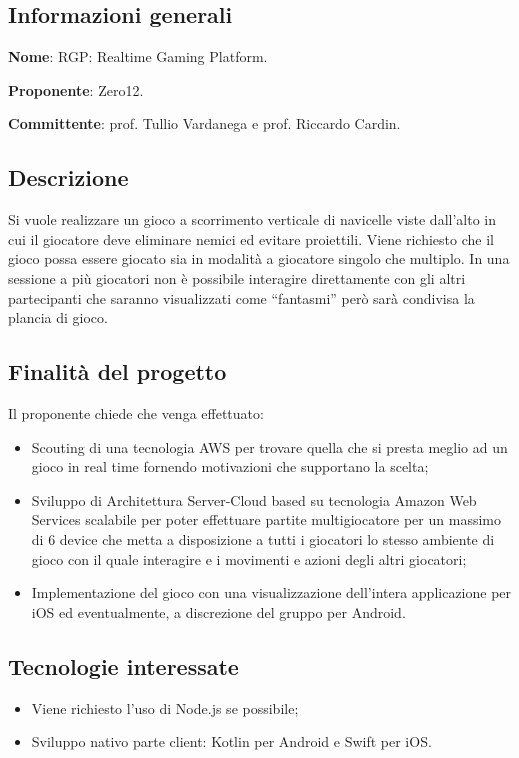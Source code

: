 \documentclass[../studio-di-fattibilita.tex]{subfiles}
\begin{document}
\subsection{Informazioni generali}%
\label{sub:c6_informazioni_generale}
\begin{description}
  \item \textbf{Nome}: RGP: Realtime Gaming Platform.
  \item \textbf{Proponente}: Zero12.
  \item \textbf{Committente}: prof. Tullio Vardanega e prof. Riccardo Cardin.
\end{description}

\subsection{Descrizione}%
\label{sub:c6_descrizione}
Si vuole realizzare un gioco a scorrimento verticale di navicelle viste dall’alto in cui il giocatore deve eliminare nemici ed evitare proiettili. Viene richiesto che il gioco possa essere giocato sia in modalità a giocatore singolo che multiplo. In una sessione a più giocatori non è possibile interagire direttamente con gli altri partecipanti che saranno visualizzati come “fantasmi” però sarà condivisa la plancia di gioco.

\subsection{Finalità del progetto}%
\label{sub:c6_finalita_del_progetto}
Il proponente chiede che venga effettuato:
\begin{itemize}
  \item Scouting di una tecnologia AWS per trovare quella che si presta meglio ad un gioco in real time fornendo motivazioni che supportano la scelta;
  \item Sviluppo di Architettura  Server-Cloud based su tecnologia Amazon Web Services scalabile per poter effettuare partite multigiocatore per un massimo di 6 device che metta a disposizione a tutti i giocatori lo stesso ambiente di gioco con il quale interagire e i movimenti e azioni degli altri giocatori;
  \item Implementazione del gioco con una visualizzazione dell’intera applicazione per iOS ed eventualmente, a discrezione del gruppo per Android.
\end{itemize}


\subsection{Tecnologie interessate}%
\label{sub:c6_tecnologie_interessate}
\begin{itemize}
  \item Viene richiesto l’uso di Node.js se possibile;
  \item Sviluppo nativo parte client: Kotlin per Android e Swift per iOS.
\end{itemize}
\end{document}
